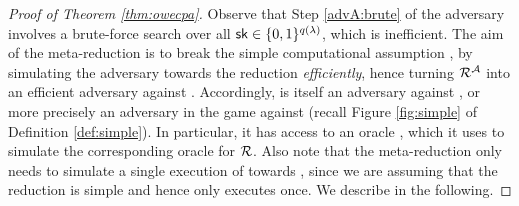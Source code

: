 \begin{proof}[Proof of Theorem \ref{thm:owecpa}]
  Observe that Step \ref{advA:brute} of the adversary \advA involves a brute-force search
  over all \(\mathsf{sk} \in \{0,1\}^{q(\lambda)}\), which is inefficient.
  The aim of the meta-reduction \redM is to break the simple computational assumption \Simple,
  by simulating the adversary \advA towards the reduction \redR \emph{efficiently},
  hence turning \(\redR^{\advA}\) into an efficient adversary against \Simple.
  Accordingly, \redM is itself an adversary against \Simple,
  or more precisely an adversary in the game \SICA against \Simple
  (recall Figure \ref{fig:simple} of Definition \ref{def:simple}).
  In particular, it has access to an oracle \oracle,
  which it uses to simulate the corresponding oracle for \(\redR\).
  Also note that the meta-reduction \redM only needs to simulate a single
  execution of \advA towards \redR,
  since we are assuming that the reduction \redR is simple
  and hence only executes \advA once.
  We describe \redM in the following.


\end{proof}
